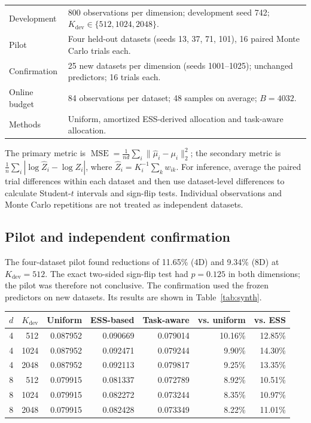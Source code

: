 \documentclass[11pt,letterpaper]{article}
\newcommand{\norm}[1]{\lVert #1\rVert_2}
\newcommand{\MSE}{\operatorname{MSE}}
\newcommand{\dev}{K_{\mathrm{dev}}}
\begin{document}
\begin{center}
\small
\begin{tabularx}{\linewidth}{@{}lY@{}}
\toprule
Development & 800 observations per dimension; development seed 742; $\dev\in\{512,1024,2048\}$.\\
Pilot & Four held-out datasets (seeds 13, 37, 71, 101), 16 paired Monte Carlo trials each.\\
Confirmation & 25 new datasets per dimension (seeds 1001--1025); unchanged predictors; 16 trials each.\\
Online budget & 84 observations per dataset; 48 samples on average; $B=4032$.\\
Methods & Uniform, amortized ESS-derived allocation and task-aware allocation.\\
\bottomrule
\end{tabularx}
\end{center}
The primary metric is $\MSE=\frac{1}{nd}\sum_i\norm{\widehat\mu_i-\mu_i}^2$; the secondary metric is $\frac1n\sum_i|\log\widehat Z_i-\log Z_i|$, where $\widehat Z_i=K_i^{-1}\sum_k w_{ik}$. For inference, average the paired trial differences within each dataset and then use dataset-level differences to calculate Student-$t$ intervals and sign-flip tests. Individual observations and Monte Carlo repetitions are not treated as independent datasets.
\subsection{Pilot and independent confirmation}
The four-dataset pilot found reductions of 11.65\% (4D) and 9.34\% (8D) at $\dev=512$. The exact two-sided sign-flip test had $p=0.125$ in both dimensions; the pilot was therefore not conclusive. The confirmation used the frozen predictors on new datasets. Its results are shown in Table~\ref{tab:synth}.
\begin{center}
\small
\begin{tabular}{@{}rr rrr rr@{}}
\toprule
$d$ & $\dev$ & Uniform & ESS-based & Task-aware & vs. uniform & vs. ESS\\
\midrule
4&512&0.087952&0.090669&0.079014&10.16\%&12.85\%\\
4&1024&0.087952&0.092471&0.079244&9.90\%&14.30\%\\
4&2048&0.087952&0.092113&0.079817&9.25\%&13.35\%\\
8&512&0.079915&0.081337&0.072789&8.92\%&10.51\%\\
8&1024&0.079915&0.082272&0.073244&8.35\%&10.97\%\\
8&2048&0.079915&0.082428&0.073349&8.22\%&11.01\%\\
\bottomrule
\end{tabular}
\label{tab:synth}
\end{center}
\end{document}

